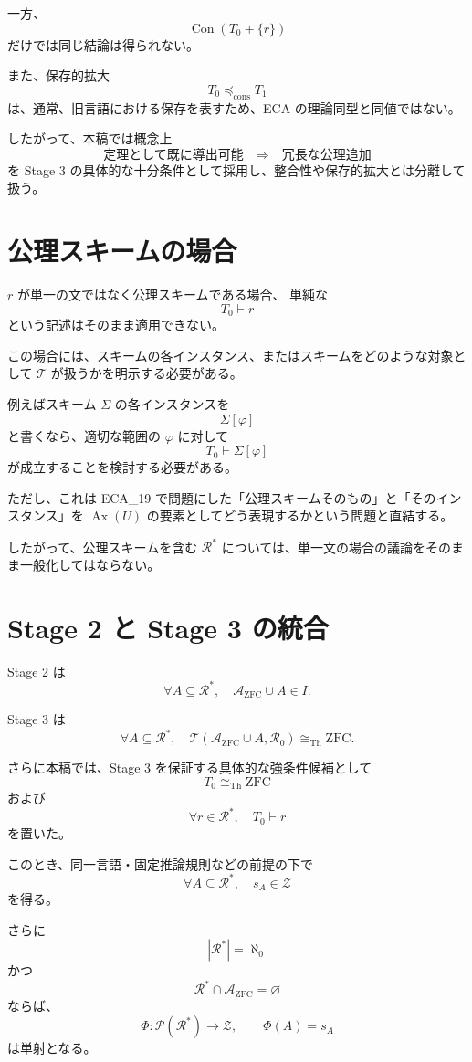 \documentclass[a4paper,11pt]{article}
\begin{document}
一方、
\[
\operatorname{Con}(T_0+\{r\})
\]
だけでは同じ結論は得られない。

また、保存的拡大
\[
T_0\preccurlyeq_{\mathrm{cons}}T_1
\]
は、通常、旧言語における保存を表すため、ECA の理論同型と同値ではない。

したがって、本稿では概念上
\[
\boxed{
\text{定理として既に導出可能}
\quad\Rightarrow\quad
\text{冗長な公理追加}
}
\]
を Stage 3 の具体的な十分条件として採用し、整合性や保存的拡大とは分離して扱う。

\section{公理スキームの場合}
$r$ が単一の文ではなく公理スキームである場合、
単純な
\[
T_0\vdash r
\]
という記述はそのまま適用できない。

この場合には、スキームの各インスタンス、またはスキームをどのような対象として $\mathcal{T}$ が扱うかを明示する必要がある。

例えばスキーム $\Sigma$ の各インスタンスを
\[
\Sigma[\varphi]
\]
と書くなら、適切な範囲の $\varphi$ に対して
\[
T_0\vdash\Sigma[\varphi]
\]
が成立することを検討する必要がある。

ただし、これは ECA_19 で問題にした「公理スキームそのもの」と「そのインスタンス」を $\operatorname{Ax}(U)$ の要素としてどう表現するかという問題と直結する。

したがって、公理スキームを含む $\mathcal{R}^*$ については、単一文の場合の議論をそのまま一般化してはならない。

\section{Stage 2 と Stage 3 の統合}

Stage 2 は
\[
\forall A\subseteq\mathcal{R}^*,\quad
\mathcal{A}_{\mathrm{ZFC}}\cup A\in I.
\]

Stage 3 は
\[
\forall A\subseteq\mathcal{R}^*,\quad
\mathcal{T}(\mathcal{A}_{\mathrm{ZFC}}\cup A,\mathcal{R}_0)
\cong_{\mathrm{Th}}\mathrm{ZFC}.
\]

さらに本稿では、Stage 3 を保証する具体的な強条件候補として
\[
T_0\cong_{\mathrm{Th}}\mathrm{ZFC}
\]
および
\[
\forall r\in\mathcal{R}^*,\quad T_0\vdash r
\]
を置いた。

このとき、同一言語・固定推論規則などの前提の下で
\[
\forall A\subseteq\mathcal{R}^*,\quad s_A\in\mathcal{Z}
\]
を得る。

さらに
\[
|\mathcal{R}^*|=\aleph_0
\]
かつ
\[
\mathcal{R}^*\cap\mathcal{A}_{\mathrm{ZFC}}=\varnothing
\]
ならば、
\[
\Phi:\mathcal{P}(\mathcal{R}^*)\to\mathcal{Z},
\qquad
\Phi(A)=s_A
\]
は単射となる。
\end{document}
